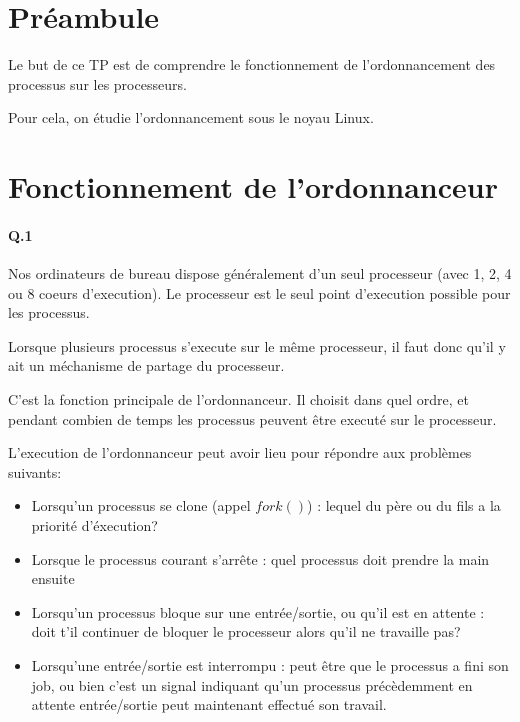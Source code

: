 \documentclass[10pt]{article}
\begin{document}
    \maketitle
    \tableofcontents
    \section{Préambule}
    
    Le but de ce TP est de comprendre le fonctionnement de l'ordonnancement des processus sur les processeurs.
    
    Pour cela, on étudie l'ordonnancement sous le noyau Linux.

    \newpage
    \section{Fonctionnement de l'ordonnanceur}
        \paragraph{Q.1}
        Nos ordinateurs de bureau dispose généralement d'un seul processeur (avec 1, 2, 4 ou 8 coeurs d'execution).
        Le processeur est le seul point d'execution possible pour les processus.
        
        Lorsque plusieurs processus s'execute sur le même processeur, il faut donc qu'il y ait un méchanisme de partage du processeur.
    
        C'est la fonction principale de l'ordonnanceur.
        Il choisit dans quel ordre, et pendant combien de temps les processus peuvent être executé sur le processeur.
                        
        L'execution de l'ordonnanceur peut avoir lieu pour répondre aux problèmes suivants:
        
        \begin{itemize}
            \item Lorsqu'un processus se clone (appel $fork()$) : lequel du père ou du fils a la priorité d'éxecution?
            \item Lorsque le processus courant s'arrête : quel processus doit prendre la main ensuite
            \item Lorsqu'un processus bloque sur une entrée/sortie, ou qu'il est en attente :
            doit t'il continuer de bloquer le processeur alors qu'il ne travaille pas?
            \item Lorsqu'une entrée/sortie est interrompu : peut être que le processus a fini son job,
            ou bien c'est un signal indiquant qu'un processus précèdemment en attente entrée/sortie
            peut maintenant effectué son travail.
        \end{itemize}
        
\end{document}
